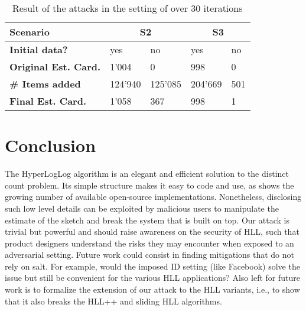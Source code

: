 \documentclass{IEEEtran}
\begin{document}
\begin{table}[h]
\caption{Result of the attacks in the setting of \cite{hllvuln} over 30 iterations}
\begin{tabular}{| m{8.5em} | m{4em} | m{4em} | m{4em} | m{4em} |}
    \hline
    \textbf{Scenario} & \multicolumn{2}{c|}{S2} & \multicolumn{2}{c|}{S3} \\ \hline
    \textbf{Initial data?} & yes & no & yes & no \\ \hline
    \textbf{Original Est. Card.} & 1'004 & 0 & 998 & 0 \\ \hline
    \textbf{\# Items added} & 124'940 & 125'085 & 204'669 & 501 \\ \hline
    \textbf{Final Est. Card.} & 1'058 & 367 & 998 & 1 \\ \hline
\end{tabular}
\label{table:tab2}
\end{table}

\section{Conclusion}\label{sec:conclusions}
The HyperLogLog algorithm is an elegant and efficient solution to the distinct count problem. Its simple structure makes it easy to code and use, as shows the growing number of available open-source implementations. Nonetheless, disclosing such low level details can be exploited by malicious users to manipulate the estimate of the sketch and break the system that is built on top. Our attack is trivial but powerful and should raise awareness on the security of HLL, such that product designers understand the risks they may encounter when exposed to an adversarial setting. Future work could consist in finding mitigations that do not rely on salt. For example, would the imposed ID setting (like Facebook) solve the issue but still be convenient for the various HLL applications? Also left for future work is to formalize the extension of our attack to the HLL variants, i.e., to show that it also breaks the HLL++ \cite{hllpratice} and sliding HLL \cite{slidinghll} algorithms.



\end{document}
